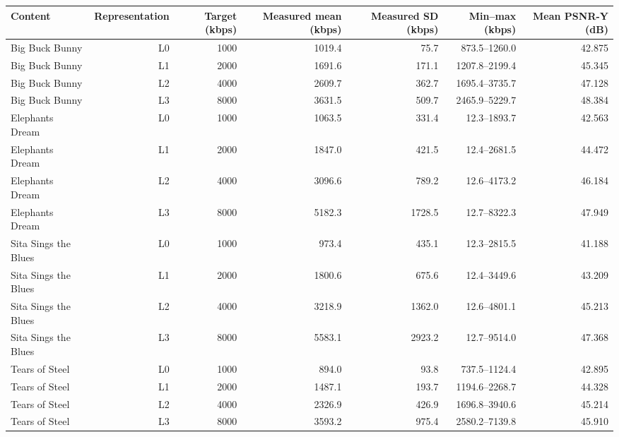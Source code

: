 \begin{tabular}{lrrrrrr}
\toprule
Content & Representation & Target (kbps) & Measured mean (kbps) & Measured SD (kbps) & Min--max (kbps) & Mean PSNR-Y (dB) \\
\midrule
Big Buck Bunny & L0 & 1000 & 1019.4 & 75.7 & 873.5--1260.0 & 42.875 \\
Big Buck Bunny & L1 & 2000 & 1691.6 & 171.1 & 1207.8--2199.4 & 45.345 \\
Big Buck Bunny & L2 & 4000 & 2609.7 & 362.7 & 1695.4--3735.7 & 47.128 \\
Big Buck Bunny & L3 & 8000 & 3631.5 & 509.7 & 2465.9--5229.7 & 48.384 \\
Elephants Dream & L0 & 1000 & 1063.5 & 331.4 & 12.3--1893.7 & 42.563 \\
Elephants Dream & L1 & 2000 & 1847.0 & 421.5 & 12.4--2681.5 & 44.472 \\
Elephants Dream & L2 & 4000 & 3096.6 & 789.2 & 12.6--4173.2 & 46.184 \\
Elephants Dream & L3 & 8000 & 5182.3 & 1728.5 & 12.7--8322.3 & 47.949 \\
Sita Sings the Blues & L0 & 1000 & 973.4 & 435.1 & 12.3--2815.5 & 41.188 \\
Sita Sings the Blues & L1 & 2000 & 1800.6 & 675.6 & 12.4--3449.6 & 43.209 \\
Sita Sings the Blues & L2 & 4000 & 3218.9 & 1362.0 & 12.6--4801.1 & 45.213 \\
Sita Sings the Blues & L3 & 8000 & 5583.1 & 2923.2 & 12.7--9514.0 & 47.368 \\
Tears of Steel & L0 & 1000 & 894.0 & 93.8 & 737.5--1124.4 & 42.895 \\
Tears of Steel & L1 & 2000 & 1487.1 & 193.7 & 1194.6--2268.7 & 44.328 \\
Tears of Steel & L2 & 4000 & 2326.9 & 426.9 & 1696.8--3940.6 & 45.214 \\
Tears of Steel & L3 & 8000 & 3593.2 & 975.4 & 2580.2--7139.8 & 45.910 \\
\bottomrule
\end{tabular}
